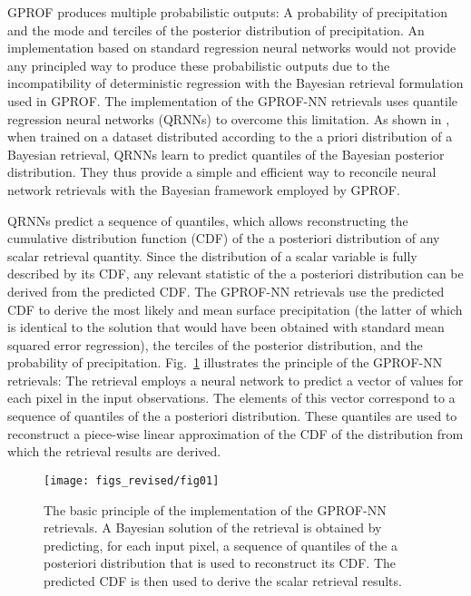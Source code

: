 \documentclass[journal abbreviation, manuscript]{copernicus}
\begin{document}
GPROF produces multiple probabilistic outputs: A probability of precipitation
and the mode and terciles of the posterior distribution of precipitation. An
implementation based on standard regression neural networks would not provide
any principled way to produce these probabilistic outputs due to the
incompatibility of deterministic regression with the Bayesian retrieval
formulation used in GPROF. The implementation of the GPROF-NN retrievals uses
quantile regression neural networks (QRNNs) to overcome this limitation. As
shown in \citet{pfreundschuh18}, when trained on a dataset distributed according
to the a priori distribution of a Bayesian retrieval, QRNNs learn to predict
quantiles of the Bayesian posterior distribution. They thus provide a simple and
efficient way to reconcile neural network retrievals with the Bayesian framework
employed by GPROF.

QRNNs predict a sequence of quantiles, which allows reconstructing the
cumulative distribution function (CDF) of the a posteriori distribution of any
scalar retrieval quantity. Since the distribution of a scalar variable is fully
described by its CDF, any relevant statistic of the a posteriori distribution
can be derived from the predicted CDF. The GPROF-NN retrievals use the predicted
CDF to derive the most likely and mean surface precipitation (the latter of
which is identical to the solution that would have been obtained with standard
mean squared error regression), the terciles of the posterior distribution, and
the probability of precipitation. Fig.~\ref{fig:gprof_nn_principle} illustrates
the principle of the GPROF-NN retrievals: The retrieval employs a neural network
to predict a vector of values for each pixel in the input observations. The
elements of this vector correspond to a sequence of quantiles of the a
posteriori distribution. These quantiles are used to reconstruct a piece-wise
linear approximation of the CDF of the distribution from which the retrieval
results are derived.

\begin{figure}[hbpt!]
  \centering \texttt{[image: figs\_revised/fig01]}
  \caption{The basic principle of the implementation of the GPROF-NN retrievals.
    A Bayesian solution of the retrieval is obtained by predicting, for each
    input pixel, a sequence of quantiles of the a posteriori distribution that
    is used to reconstruct its CDF. The predicted CDF is then used to derive the
    scalar retrieval results.}
  \label{fig:gprof_nn_principle}
\end{figure}
\end{document}
